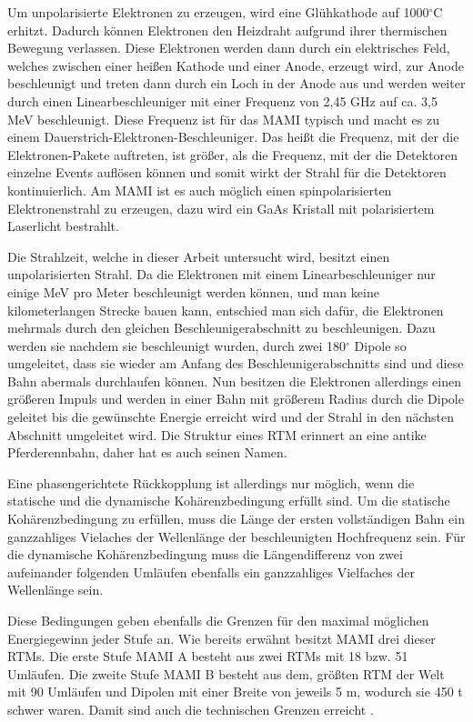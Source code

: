 \documentclass[a4paper,11pt,oneside,final,german,openbib,pdftex]{scrbook}
\begin{document}
{Um unpolarisierte Elektronen zu erzeugen, wird eine Glühkathode auf 1000$^{\circ}$C erhitzt. Dadurch können Elektronen den Heizdraht aufgrund ihrer thermischen Bewegung verlassen. Diese Elektronen werden dann durch ein elektrisches Feld, welches zwischen einer heißen Kathode und einer Anode, erzeugt wird, zur Anode beschleunigt und treten dann durch ein Loch in der Anode aus und werden weiter durch einen Linearbeschleuniger mit einer Frequenz von 2,45 GHz auf ca. 3,5 MeV beschleunigt. Diese Frequenz ist für das MAMI typisch und macht es zu einem Dauerstrich-Elektronen-Beschleuniger. Das heißt die Frequenz, mit der die Elektronen-Pakete auftreten, ist größer, als die Frequenz, mit der die Detektoren einzelne Events auflösen können und somit wirkt der Strahl für die Detektoren kontinuierlich.
Am MAMI ist es auch m\"oglich einen spinpolarisierten Elektronenstrahl zu erzeugen, dazu wird ein GaAs Kristall mit polarisiertem Laserlicht bestrahlt. 

Die Strahlzeit, welche in dieser Arbeit untersucht wird, besitzt einen unpolarisierten Strahl.
\newline
Da die Elektronen mit einem Linearbeschleuniger nur einige MeV pro Meter beschleunigt werden k\"onnen, und man keine kilometerlangen Strecke bauen kann, entschied man sich daf\"ur, die Elektronen mehrmals durch den gleichen Beschleunigerabschnitt zu beschleunigen. Dazu werden sie nachdem sie beschleunigt wurden, durch zwei 180$^{\circ}$ Dipole so umgeleitet, dass sie wieder am Anfang des Beschleunigerabschnitts sind und diese Bahn abermals durchlaufen können. Nun besitzen die Elektronen allerdings einen gr\"o{\ss}eren Impuls und werden in einer Bahn mit gr\"o{\ss}erem Radius durch die Dipole geleitet bis die gew\"unschte Energie erreicht wird und der Strahl in den n\"achsten Abschnitt umgeleitet wird. Die Struktur eines RTM erinnert an eine antike Pferderennbahn, daher hat es auch seinen Namen.

 Eine phasengerichtete R\"uckkopplung ist allerdings nur m\"oglich, wenn die statische und die dynamische Koh\"arenzbedingung erf\"ullt sind. Um die statische Koh\"arenzbedingung zu erf\"ullen, muss die L\"ange der ersten vollst\"andigen Bahn ein ganzzahliges Vielaches der Wellenl\"ange der beschleunigten Hochfrequenz sein. F\"ur die dynamische Koh\"arenzbedingung muss die L\"angendifferenz von zwei aufeinander folgenden Uml\"aufen ebenfalls ein ganzzahliges Vielfaches der Wellenl\"ange sein\cite{Un08}. 
 
 Diese Bedingungen geben ebenfalls die Grenzen f\"ur den maximal m\"oglichen Energiegewinn jeder Stufe an. 
\newline
Wie bereits erw\"ahnt besitzt MAMI drei dieser RTMs. Die erste Stufe MAMI A besteht aus zwei RTMs mit 18 bzw. 51 Uml\"aufen. Die zweite Stufe MAMI B besteht aus dem, gr\"o{\ss}ten RTM der Welt mit 90 Uml\"aufen und Dipolen mit einer Breite von jeweils 5 m, wodurch sie 450 t schwer waren. Damit sind auch die technischen Grenzen erreicht \cite{KPh11F}.


}
\end{document}
